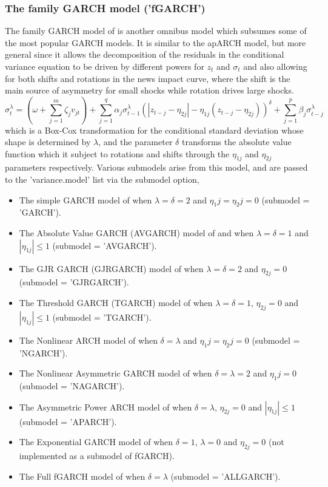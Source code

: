 \subsubsection{The family GARCH model ('fGARCH')}\label{section:fgarch}
The family GARCH model of \cite{Hentschel1995} is another omnibus model which
subsumes some of the most popular GARCH models. It is similar to the apARCH
model, but more general since it allows the decomposition of the residuals in
the conditional variance equation to be driven by different powers for $z_t$
and $\sigma_t$ and also allowing for both shifts and rotations in the news
impact curve, where the shift is the main source of asymmetry for small shocks
while rotation drives large shocks.
\begin{equation}\label{eq:fgarch}
\sigma _t^\lambda  = \left( {\omega  + \sum\limits_{j = 1}^m {{\zeta _j}{v_{jt}}} } \right) + \sum\limits_{j = 1}^q {{\alpha _j}\sigma _{t - 1}^\lambda {{\left( {\left| {{z_{t - j}} - {\eta _{2j}}} \right| - {\eta _{1j}}\left( {{z_{t - j}} - {\eta _{2j}}} \right)} \right)}^\delta } + } \sum\limits_{j = 1}^p {{\beta _j}\sigma _{t - j}^\lambda }
\end{equation}
which is a Box-Cox transformation for the conditional standard deviation whose
shape is determined by $\lambda$, and the parameter $\delta$ transforms the
absolute value function which it subject to rotations and shifts through the
$\eta_{1j}$ and $\eta_{2j}$ parameters respectively. Various submodels arise
from this model, and are passed to the \verb@ugarchspec@ 'variance.model' list
via the submodel option,
\begin{itemize}
\item The simple GARCH model of \cite{Bollerslev1986} when $\lambda=\delta=2$ and $\eta_1j=\eta_2j=0$ (submodel = 'GARCH').
\item The Absolute Value GARCH (AVGARCH) model of \cite{Taylor1986} and \cite{Schwert1990} when $\lambda=\delta=1$ and $|{{\eta _{1j}}}| \leq 1$ (submodel = 'AVGARCH').
\item The GJR GARCH (GJRGARCH) model of \cite{Glosten1993} when $\lambda=\delta=2$ and $\eta_{2j}=0$ (submodel = 'GJRGARCH').
\item The Threshold GARCH (TGARCH) model of \cite{Zakoian1994} when $\lambda=\delta=1$, $\eta_{2j}=0$ and $|{{\eta _{1j}}}| \leq 1$ (submodel = 'TGARCH').
\item The Nonlinear ARCH model of \cite{Higgins1992} when $\delta=\lambda$ and  $\eta_1j=\eta_2j=0$ (submodel = 'NGARCH').
\item The Nonlinear Asymmetric GARCH model of \cite{Engle1993} when $\delta=\lambda=2$ and $\eta_1j=0$ (submodel = 'NAGARCH').
\item The Asymmetric Power ARCH model of \cite{Ding1993} when $\delta=\lambda$, $\eta_{2j}=0$ and $|{{\eta _{1j}}}| \leq 1$ (submodel = 'APARCH').
\item The Exponential GARCH model of \cite{Nelson1991} when $\delta=1$, $\lambda=0$ and $\eta_{2j}=0$ (not implemented as a submodel of fGARCH).
\item The Full fGARCH model of \cite{Hentschel1995} when $\delta=\lambda$ (submodel = 'ALLGARCH').
\end{itemize}

